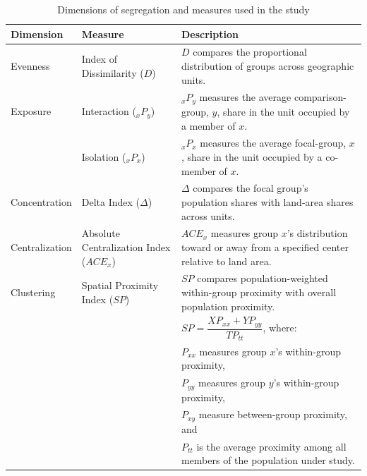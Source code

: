 \documentclass{report}[11pt,letterpaper]
\begin{document}
\begin{table}[htbp]
\centering
\small
\caption{Dimensions of segregation and measures used in the study}
\bigskip
\label{tab:segregation-measures}
\renewcommand{\arraystretch}{1.25}
\begin{tabularx}{\textwidth}{@{}p{}
                               p{} X@{}}
\toprule
Dimension & Measure & Description \\
\midrule

Evenness
& Index of Dissimilarity ($D$)
& $D$ compares the proportional distribution of groups across geographic units. \\

\addlinespace
Exposure
& Interaction (${}_{x}P_y$)
& ${}_{x}P_y$ measures the average comparison-group, $y$, share in the unit occupied by a member of $x$. \\

& Isolation (${}_{x}P_x$)
& ${}_{x}P_x$ measures the average focal-group, $x$, share in the
unit occupied by a co-member of $x$. \\

\addlinespace
Concentration
& Delta Index ($\Delta$)
& $\Delta$ compares the focal group's population shares with
land-area shares across units. \\

\addlinespace
Centralization
& Absolute Centralization Index ($ACE_x$)
& $ACE_x$ measures group $x$'s distribution toward
or away from a specified center relative to land area. \\

\addlinespace
Clustering
& Spatial Proximity Index ($SP$)
& $SP$ compares population-weighted within-group proximity
with overall population proximity. \\

& & $SP = \dfrac{XP_{xx} + YP_{yy}}{TP_{tt}} $, where: \\

& & $P_{xx}$
measures group $x$'s within-group proximity, \\

& & $P_{yy}$
measures group $y$'s within-group proximity, \\

& & $P_{xy}$
measure between-group proximity, and \\

& & $P_{tt}$
is the average proximity among all members of the population under study. \\


\end{tabularx}
\end{table}
\end{document}
